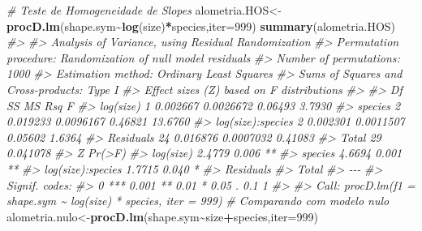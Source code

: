\documentclass[
]{book}
\newenvironment{Shaded}{\begin{snugshade}}{\end{snugshade}}
\newcommand{\AttributeTok}[1]{\textcolor[rgb]{0.13,0.29,0.53}{#1}}
\newcommand{\CommentTok}[1]{\textcolor[rgb]{0.56,0.35,0.01}{\textit{#1}}}
\newcommand{\DecValTok}[1]{\textcolor[rgb]{0.00,0.00,0.81}{#1}}
\newcommand{\FunctionTok}[1]{\textcolor[rgb]{0.13,0.29,0.53}{\textbf{#1}}}
\newcommand{\NormalTok}[1]{#1}
\newcommand{\OtherTok}[1]{\textcolor[rgb]{0.56,0.35,0.01}{#1}}
\newcommand{\SpecialCharTok}[1]{\textcolor[rgb]{0.81,0.36,0.00}{\textbf{#1}}}
\begin{document}
\begin{Shaded}
\begin{Highlighting}[]
\CommentTok{\# Teste de Homogeneidade de Slopes}
\NormalTok{alometria.HOS}\OtherTok{\textless{}{-}}\FunctionTok{procD.lm}\NormalTok{(shape.sym}\SpecialCharTok{\textasciitilde{}}\FunctionTok{log}\NormalTok{(size)}\SpecialCharTok{*}\NormalTok{species,}\AttributeTok{iter=}\DecValTok{999}\NormalTok{)}
\FunctionTok{summary}\NormalTok{(alometria.HOS)}
\CommentTok{\#\textgreater{} }
\CommentTok{\#\textgreater{} Analysis of Variance, using Residual Randomization}
\CommentTok{\#\textgreater{} Permutation procedure: Randomization of null model residuals }
\CommentTok{\#\textgreater{} Number of permutations: 1000 }
\CommentTok{\#\textgreater{} Estimation method: Ordinary Least Squares }
\CommentTok{\#\textgreater{} Sums of Squares and Cross{-}products: Type I }
\CommentTok{\#\textgreater{} Effect sizes (Z) based on F distributions}
\CommentTok{\#\textgreater{} }
\CommentTok{\#\textgreater{}                   Df       SS        MS     Rsq       F}
\CommentTok{\#\textgreater{} log(size)          1 0.002667 0.0026672 0.06493  3.7930}
\CommentTok{\#\textgreater{} species            2 0.019233 0.0096167 0.46821 13.6760}
\CommentTok{\#\textgreater{} log(size):species  2 0.002301 0.0011507 0.05602  1.6364}
\CommentTok{\#\textgreater{} Residuals         24 0.016876 0.0007032 0.41083        }
\CommentTok{\#\textgreater{} Total             29 0.041078                          }
\CommentTok{\#\textgreater{}                        Z Pr(\textgreater{}F)   }
\CommentTok{\#\textgreater{} log(size)         2.4779  0.006 **}
\CommentTok{\#\textgreater{} species           4.6694  0.001 **}
\CommentTok{\#\textgreater{} log(size):species 1.7715  0.040 * }
\CommentTok{\#\textgreater{} Residuals                         }
\CommentTok{\#\textgreater{} Total                             }
\CommentTok{\#\textgreater{} {-}{-}{-}}
\CommentTok{\#\textgreater{} Signif. codes:  }
\CommentTok{\#\textgreater{} 0 \textquotesingle{}***\textquotesingle{} 0.001 \textquotesingle{}**\textquotesingle{} 0.01 \textquotesingle{}*\textquotesingle{} 0.05 \textquotesingle{}.\textquotesingle{} 0.1 \textquotesingle{} \textquotesingle{} 1}
\CommentTok{\#\textgreater{} }
\CommentTok{\#\textgreater{} Call: procD.lm(f1 = shape.sym \textasciitilde{} log(size) * species, iter = 999)}
\CommentTok{\# Comparando com modelo nulo}
\NormalTok{alometria.nulo}\OtherTok{\textless{}{-}}\FunctionTok{procD.lm}\NormalTok{(shape.sym}\SpecialCharTok{\textasciitilde{}}\NormalTok{size}\SpecialCharTok{+}\NormalTok{species,}\AttributeTok{iter=}\DecValTok{999}\NormalTok{)}

\end{Highlighting}
\end{Shaded}
\end{document}
